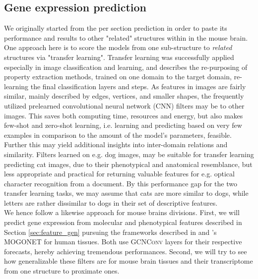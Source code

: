 \documentclass[]{article}
\begin{document}
\subsection{Gene expression prediction}
We originally started from the per section prediction in order to paste its performance and results to other "related" structures within in the mouse brain. One approach here is to score the models from one sub-structure to \textit{related} structures via "transfer learning". Transfer learning was successfully applied especially in image classification and learning, and describes the re-purposing of property extraction methods, trained on one domain to the target domain, re-learning the final classification layers and steps. As features in images are fairly similar, mainly described by edges, vertices, and smaller shapes, the frequently utilized prelearned convolutional neural network (CNN) filters may be to other images. This saves both computing time, resources and energy, but also makes few-shot and zero-shot learning, i.e. learning and predicting based on very few examples in comparison to the amount of the model's parameters, feasible. Further this may yield additional insights into inter-domain relations and similarity. Filters learned on e.g. dog images, may be suitable for transfer learning predicting cat images, due to their phenotypical and anatomical resemblance, but less appropriate and practical for returning valuable features for e.g. optical character recognition from a document. By this performance gap for the two transfer learning tasks, we may assume that cats are more similar to dogs, while letters are rather dissimilar to dogs in their set of descriptive features. \\

We hence follow a likewise approach for mouse brains divisions. First, we will predict gene expression from molecular and phenotypical features described in Section \ref{sec:feature_gen} pursuing the frameworks described in \citet{schulte2021integration} and \citet{wang2021mogonet}'s MOGONET for human tissues. Both use \textsc{GCNConv} layers for their respective forecasts, hereby achieving tremendous performances. Second, we will try to see how generalizable these filters are for mouse brain tissues and their transcriptome from one structure to proximate ones.\\
\end{document}
